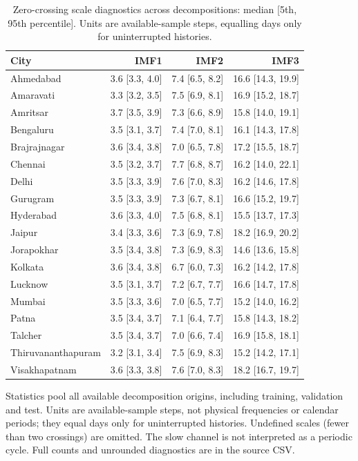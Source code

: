 \begin{table}[!htbp]
\centering
\caption{Zero-crossing scale diagnostics across decompositions: median [5th, 95th percentile]. Units are available-sample steps, equalling days only for uninterrupted histories.}\label{tab:periods0}
\setlength{\tabcolsep}{4pt}
\begin{tabular}{lrrr}
\toprule
City & IMF1 & IMF2 & IMF3 \\
\midrule
Ahmedabad & 3.6 [3.3, 4.0] & 7.4 [6.5, 8.2] & 16.6 [14.3, 19.9] \\
Amaravati & 3.3 [3.2, 3.5] & 7.5 [6.9, 8.1] & 16.9 [15.2, 18.7] \\
Amritsar & 3.7 [3.5, 3.9] & 7.3 [6.6, 8.9] & 15.8 [14.0, 19.1] \\
Bengaluru & 3.5 [3.1, 3.7] & 7.4 [7.0, 8.1] & 16.1 [14.3, 17.8] \\
Brajrajnagar & 3.6 [3.4, 3.8] & 7.0 [6.5, 7.8] & 17.2 [15.5, 18.7] \\
Chennai & 3.5 [3.2, 3.7] & 7.7 [6.8, 8.7] & 16.2 [14.0, 22.1] \\
Delhi & 3.5 [3.3, 3.9] & 7.6 [7.0, 8.3] & 16.2 [14.6, 17.8] \\
Gurugram & 3.5 [3.3, 3.9] & 7.3 [6.7, 8.1] & 16.6 [15.2, 19.7] \\
Hyderabad & 3.6 [3.3, 4.0] & 7.5 [6.8, 8.1] & 15.5 [13.7, 17.3] \\
Jaipur & 3.4 [3.3, 3.6] & 7.3 [6.9, 7.8] & 18.2 [16.9, 20.2] \\
Jorapokhar & 3.5 [3.4, 3.8] & 7.3 [6.9, 8.3] & 14.6 [13.6, 15.8] \\
Kolkata & 3.6 [3.4, 3.8] & 6.7 [6.0, 7.3] & 16.2 [14.2, 17.8] \\
Lucknow & 3.5 [3.1, 3.7] & 7.2 [6.7, 7.7] & 16.6 [14.7, 17.8] \\
Mumbai & 3.5 [3.3, 3.6] & 7.0 [6.5, 7.7] & 15.2 [14.0, 16.2] \\
Patna & 3.5 [3.4, 3.7] & 7.1 [6.4, 7.7] & 15.8 [14.3, 18.2] \\
Talcher & 3.5 [3.4, 3.7] & 7.0 [6.6, 7.4] & 16.9 [15.8, 18.1] \\
Thiruvananthapuram & 3.2 [3.1, 3.4] & 7.5 [6.9, 8.3] & 15.2 [14.2, 17.1] \\
Visakhapatnam & 3.6 [3.3, 3.8] & 7.6 [7.0, 8.3] & 18.2 [16.7, 19.7] \\
\bottomrule
\end{tabular}
\par\smallskip\begin{minipage}{0.98\linewidth}\footnotesize Statistics pool all available decomposition origins, including training, validation and test. Units are available-sample steps, not physical frequencies or calendar periods; they equal days only for uninterrupted histories. Undefined scales (fewer than two crossings) are omitted. The slow channel is not interpreted as a periodic cycle. Full counts and unrounded diagnostics are in the source CSV.\end{minipage}
\end{table}
